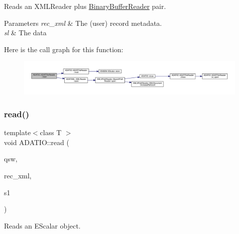 Reads an X\+M\+L\+Reader plus \mbox{\hyperlink{classADATIO_1_1BinaryBufferReader}{Binary\+Buffer\+Reader}} pair. 


\begin{DoxyParams}{Parameters}
{\em rec\+\_\+xml} & The (user) record metadata. \\
\hline
{\em sl} & The data \\
\hline
\end{DoxyParams}
Here is the call graph for this function\+:\nopagebreak
\begin{figure}[H]
\begin{center}
\leavevmode
\includegraphics[width=350pt]{db/de5/group__qio_gadf1e0b4405e14798a0610efd8774f8d0_cgraph}
\end{center}
\end{figure}
\mbox{\label{group__qio_ga3dd8ea4aebc2b69c0ad2996743816341}} 
\subsubsection{\texorpdfstring{read()}{read()}\hspace{0.1cm}{\footnotesize\ttfamily [5/7]}}
{\footnotesize\ttfamily template$<$class T $>$ \\
void A\+D\+A\+T\+I\+O\+::read (\begin{DoxyParamCaption}\item[{\mbox{\hyperlink{classADATIO_1_1ADATFileReader}{A\+D\+A\+T\+File\+Reader}} \&}]{qsw,  }\item[{\mbox{\hyperlink{classADATXML_1_1XMLReader}{X\+M\+L\+Reader}} \&}]{rec\+\_\+xml,  }\item[{\mbox{\hyperlink{classENSEM_1_1EScalar}{E\+Scalar}}$<$ T $>$ \&}]{s1 }\end{DoxyParamCaption})}



Reads an E\+Scalar object. 



